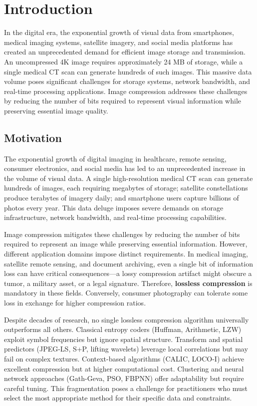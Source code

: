 \section{Introduction}

In the digital era, the exponential growth of visual data from smartphones, medical imaging systems, satellite imagery, and social media platforms has created an unprecedented demand for efficient image storage and transmission. An uncompressed 4K image requires approximately 24 MB of storage, while a single medical CT scan can generate hundreds of such images. This massive data volume poses significant challenges for storage systems, network bandwidth, and real-time processing applications. Image compression addresses these challenges by reducing the number of bits required to represent visual information while preserving essential image quality.

\subsection{Motivation}

The exponential growth of digital imaging in healthcare, remote sensing, consumer electronics, and social media has led to an unprecedented increase in the volume of visual data. A single high-resolution medical CT scan can generate hundreds of images, each requiring megabytes of storage; satellite constellations produce terabytes of imagery daily; and smartphone users capture billions of photos every year. This data deluge imposes severe demands on storage infrastructure, network bandwidth, and real-time processing capabilities.

Image compression mitigates these challenges by reducing the number of bits required to represent an image while preserving essential information. However, different application domains impose distinct requirements. In medical imaging, satellite remote sensing, and document archiving, even a single bit of information loss can have critical consequences—a lossy compression artifact might obscure a tumor, a military asset, or a legal signature. Therefore, \textbf{lossless compression} is mandatory in these fields. Conversely, consumer photography can tolerate some loss in exchange for higher compression ratios.

Despite decades of research, no single lossless compression algorithm universally outperforms all others. Classical entropy coders (Huffman, Arithmetic, LZW) exploit symbol frequencies but ignore spatial structure. Transform and spatial predictors (JPEG-LS, S+P, lifting wavelets) leverage local correlations but may fail on complex textures. Context-based algorithms (CALIC, LOCO-I) achieve excellent compression but at higher computational cost. Clustering and neural network approaches (Gath-Geva, PSO, FBPNN) offer adaptability but require careful tuning. This fragmentation poses a challenge for practitioners who must select the most appropriate method for their specific data and constraints.

